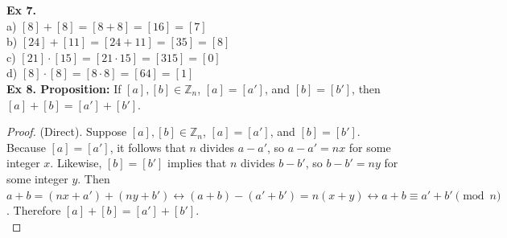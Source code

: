 \documentclass{article}
\begin{document}
\noindent\textbf{Ex 7.}\\
a) $[8]+[8]=[8+8]=[16]=[7]$\\
b) $[24]+[11]=[24+11]=[35]=[8]$\\
c) $[21] \cdot{} [15] = [21 \cdot{} 15]= [315]=[0]$\\
d) $[8] \cdot{} [8] = [8 \cdot{} 8] = [64] = [1]$\\

\noindent\textbf{Ex 8. Proposition:} If $[a], [b] \in \mathbb{Z}_n$, $[a] = [a']$, and $[b] = [b']$, then $[a] + [b] = [a'] + [b']$.
\begin{proof}
(Direct). Suppose $[a], [b] \in \mathbb{Z}_n$, $[a] = [a']$, and $[b] = [b']$.\\
Because $[a]=[a']$, it follows that $n$ divides $a-a'$, so $a-a'=nx$ for some integer $x$. Likewise, $[b]=[b']$ implies that $n$ divides $b-b'$, so $b-b'=ny$ for some integer $y$. Then $a+b=(nx+a')+(ny+b') \leftrightarrow (a+b) - (a'+b')= n(x+y) \leftrightarrow a+b \equiv a'+b' \pmod{n}$. Therefore $[a] + [b] = [a'] + [b']$.\\
\end{proof}
\end{document}
